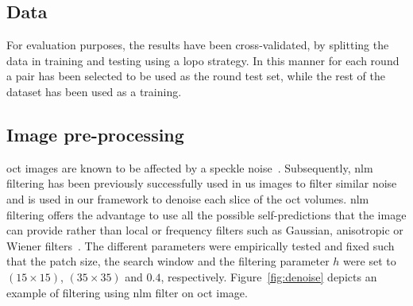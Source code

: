 \subsection{Data}
\color{red}{
  \begin{itemize}
  \item cross-validation
  \item our dataset
  \item DUC dataset
  \end{itemize}}\color{black}

For evaluation purposes, the results have been cross-validated, by splitting the data in training and testing using a \ac{lopo} strategy. In this manner for each round a pair \color{red}{dce,normal} has been selected to be used as the round test set, while the rest of the dataset has been used as a training. \color{black}

\color{red}{The dataset blablablabal...}\color{black}
\color{red}{The duc dataset blabla bla...}\color{black}

\subsection{Image pre-processing}

\Ac{oct} images are known to be affected by a speckle noise~\cite{schmitt1999speckle}.
Subsequently, \ac{nlm}~\cite{buades2005non} filtering has been previously successfully used in \ac{us} images to filter similar noise~\cite{Coupe2009} and is used in our framework to denoise each slice of the  \ac{oct} volumes.
\ac{nlm} filtering offers the advantage to use all the possible self-predictions that the image can provide rather than local or frequency filters such as Gaussian, anisotropic or Wiener filters~\cite{buades2005non}.
The different parameters were empirically tested and fixed such that the patch size, the search window and the filtering parameter $h$ were set to $(15 \times 15)$, $(35 \times 35)$ and $0.4$, respectively.
Figure~\ref{fig:denoise} depicts an example of filtering using \ac{nlm} filter on \ac{oct} image.

